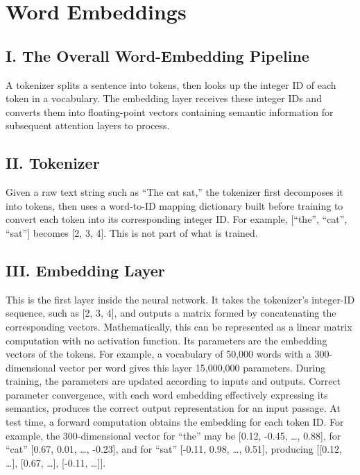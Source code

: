\setcounter{section}{1}

\hypertarget{word-embeddings}{%
\section{Word Embeddings}\label{word-embeddings}}

\hypertarget{i.-the-overall-word-embedding-pipeline}{%
\subsection{I. The Overall Word-Embedding Pipeline}\label{i.-the-overall-word-embedding-pipeline}}

A tokenizer splits a sentence into tokens, then looks up the integer ID of each token in a vocabulary. The embedding layer receives these integer IDs and converts them into floating-point vectors containing semantic information for subsequent attention layers to process.

\hypertarget{ii.-tokenizer}{%
\subsection{II. Tokenizer}\label{ii.-tokenizer}}

Given a raw text string such as ``The cat sat,'' the tokenizer first decomposes it into tokens, then uses a word-to-ID mapping dictionary built before training to convert each token into its corresponding integer ID. For example, {[}``the'', ``cat'', ``sat''{]} becomes {[}2, 3, 4{]}. This is not part of what is trained.

\hypertarget{iii.-embedding-layer}{%
\subsection{III. Embedding Layer}\label{iii.-embedding-layer}}

This is the first layer inside the neural network. It takes the tokenizer's integer-ID sequence, such as {[}2, 3, 4{]}, and outputs a matrix formed by concatenating the corresponding vectors. Mathematically, this can be represented as a linear matrix computation with no activation function. Its parameters are the embedding vectors of the tokens. For example, a vocabulary of 50,000 words with a 300-dimensional vector per word gives this layer 15,000,000 parameters. During training, the parameters are updated according to inputs and outputs. Correct parameter convergence, with each word embedding effectively expressing its semantics, produces the correct output representation for an input passage. At test time, a forward computation obtains the embedding for each token ID. For example, the 300-dimensional vector for ``the'' may be {[}0.12, -0.45, \ldots, 0.88{]}, for ``cat'' {[}0.67, 0.01, \ldots, -0.23{]}, and for ``sat'' {[}-0.11, 0.98, \ldots, 0.51{]}, producing {[}{[}0.12, \ldots{]}, {[}0.67, \ldots{]}, {[}-0.11, \ldots{]}{]}.

